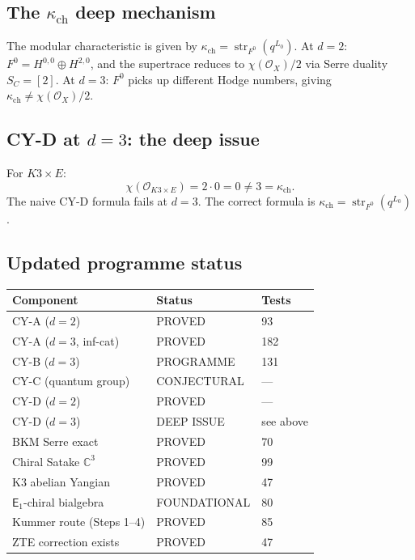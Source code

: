 \documentclass[11pt]{article}
\newcommand{\cO}{\mathcal{O}}
\newcommand{\C}{\mathbb{C}}
\newcommand{\Eone}{\mathsf{E}_1}
\begin{document}
\subsection{The $\kappa_{\mathrm{ch}}$ deep mechanism}

\begin{observation}
\label{obs:kappa-ch-mechanism}
The modular characteristic is given by
$\kappa_{\mathrm{ch}} = \operatorname{str}_{F^0}(q^{L_0})$.
At $d = 2$: $F^0 = H^{0,0} \oplus H^{2,0}$, and the supertrace
reduces to $\chi(\cO_X)/2$ via Serre duality $S_C = [2]$.
At $d = 3$: $F^0$ picks up different Hodge numbers, giving
$\kappa_{\mathrm{ch}} \neq \chi(\cO_X)/2$.
\end{observation}

\subsection{CY-D at $d = 3$: the deep issue}

\begin{warning}[CY-D fails at $d = 3$ in naive form]
\label{warn:cy-d-d3}
For $K3 \times E$:
\[
 \chi(\cO_{K3 \times E}) = 2 \cdot 0 = 0 \neq 3 = \kappa_{\mathrm{ch}}.
\]
The naive CY-D formula fails at $d = 3$.
The correct formula is
$\kappa_{\mathrm{ch}} = \operatorname{str}_{F^0}(q^{L_0})$.
\end{warning}

\subsection{Updated programme status}
\label{subsec:final-programme-status}

\begin{center}
\renewcommand{\arraystretch}{1.3}
\begin{tabular}{lll}
 \toprule
 \textbf{Component} & \textbf{Status} & \textbf{Tests} \\
 \midrule
 CY-A ($d = 2$) & PROVED & 93 \\
 CY-A ($d = 3$, inf-cat) & PROVED & 182 \\
 CY-B ($d = 3$) & PROGRAMME & 131 \\
 CY-C (quantum group) & CONJECTURAL & --- \\
 CY-D ($d = 2$) & PROVED & --- \\
 CY-D ($d = 3$) & DEEP ISSUE & see above \\
 BKM Serre exact & PROVED & 70 \\
 Chiral Satake $\C^3$ & PROVED & 99 \\
 K3 abelian Yangian & PROVED & 47 \\
 $\Eone$-chiral bialgebra & FOUNDATIONAL & 80 \\
 Kummer route (Steps 1--4) & PROVED & 85 \\
 ZTE correction exists & PROVED & 47 \\
 \bottomrule
\end{tabular}
\end{center}
\end{document}
